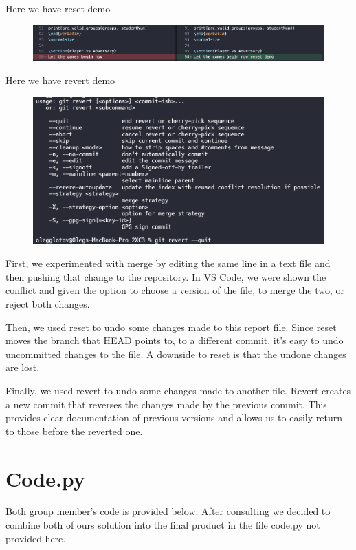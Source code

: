 \documentclass[twocolumn, 10pt]{article}
\begin{document}
Here we have reset demo

\begin{figure}[H]
\includegraphics[width=\linewidth]{reset}
\end{figure}

Here we have revert demo

\begin{figure}[H]
\includegraphics[width=\linewidth]{revert}
\end{figure}

First, we experimented with merge by editing the same line in a text file and then pushing that change to the repository. In VS Code, we were shown the conflict and given the option to choose a version of the file, to merge the two, or reject both changes.

Then, we used reset to undo some changes made to this report file. Since reset moves the branch that HEAD points to, to a different commit, it's easy to undo uncommitted changes to the file. A downside to reset is that the undone changes are lost.

Finally, we used revert to undo some changes made to another file. Revert creates a new commit that reverses the changes made by the previous commit. This provides clear documentation of previous versions and allows us to easily return to those before the reverted one.

\section{Code.py}

Both group member's code is provided below. After consulting we decided to combine both of ours solution into the final product in the file code.py not provided here.
\end{document}
